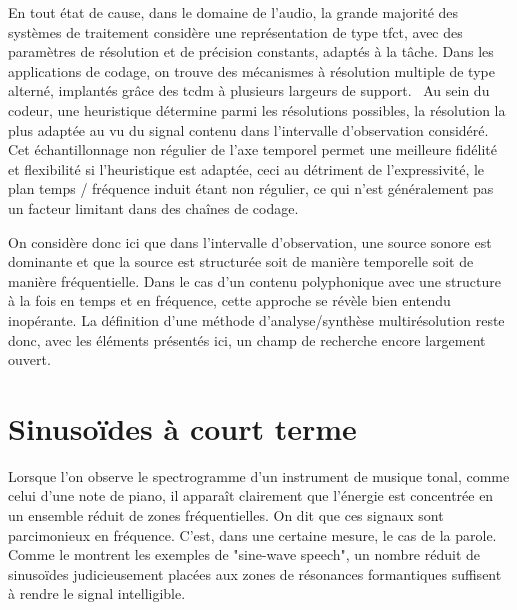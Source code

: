 

En tout état de cause, dans le domaine de l'audio, la grande majorité des systèmes de traitement considère une représentation de type tfct, avec des paramètres de résolution et de précision constants, adaptés à la tâche. Dans les applications de codage, on trouve des mécanismes à résolution multiple de type alterné, implantés grâce des tcdm à plusieurs largeurs de support.~\cite{brandenburg1999mp3} Au sein du codeur, une heuristique détermine parmi les résolutions possibles, la résolution la plus adaptée au vu du signal contenu dans l'intervalle d'observation considéré. Cet échantillonnage non régulier de l'axe temporel permet une meilleure fidélité et flexibilité si l'heuristique est adaptée, ceci au détriment de l'expressivité, le plan temps / fréquence induit étant non régulier, ce qui n'est généralement pas un facteur limitant dans des chaînes de codage.

On considère donc ici que dans l'intervalle d'observation, une source sonore est dominante et que la source est structurée soit de manière temporelle soit de manière fréquentielle. Dans le cas d'un contenu polyphonique avec une structure à la fois en temps et en fréquence, cette approche se révèle bien entendu inopérante. La définition d'une méthode d'analyse/synthèse multirésolution reste donc, avec les éléments présentés ici, un champ de recherche encore largement ouvert.

\section{ \nmu Sinusoïdes à court terme}  \label{sec:sct}

Lorsque l'on observe le spectrogramme d'un instrument de musique tonal, comme celui d'une note de piano, il apparaît clairement que l'énergie est concentrée en un ensemble réduit de zones fréquentielles. On dit que ces signaux sont parcimonieux en fréquence. C'est, dans une certaine mesure, le cas de la parole. Comme le montrent les exemples de "sine-wave speech", un nombre réduit de sinusoïdes judicieusement placées aux zones de résonances formantiques suffisent à rendre le signal intelligible.


